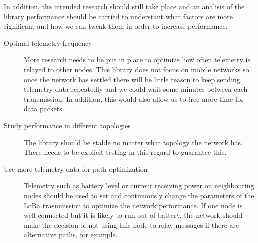 In addition, the intended research should still take place and an analisis of the library performance should be carried to understant what factors are more significant and how we can tweak them in order to increase performance.
\begin{description}
	\item[Optimal telemetry frequency] More research needs to be put in place to optimize how often telemetry is relayed to other nodes. This library does not focus on mobile networks so once the network has settled there will be little reason to keep sending telemetry data repeatedly and we could wait some minutes between each transmission. In addition, this would also allow us to free more time for data packets.
	\item[Study performance in different topologies] The library should be stable no matter what topology the network has. There needs to be explicit testing in this regard to guarantee this.
	\item[Use more telemetry data for path optimization] Telemetry such as battery level or current receiving power on neighbouring nodes should be used to set and continuously change the parameters of the LoRa trasnmission to optimize the network performance. If one node is well connected but it is likely to run out of battery, the network should make the decision of not using this node to relay messages if there are alternative paths, for example.
\end{description}